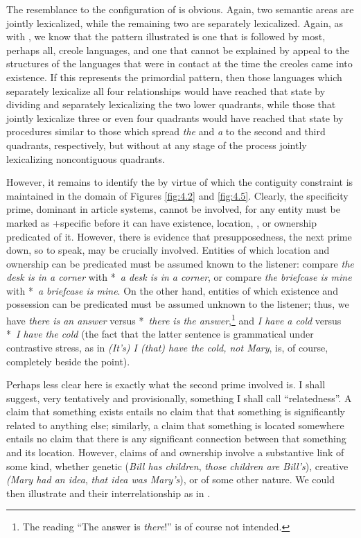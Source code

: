 The resemblance to the configuration of  is obvious. Again, two semantic areas are jointly lexicalized, while the remaining two are separately lexicalized. Again, as with , we know that the pattern illustrated is one that is followed by most, perhaps all, creole languages, and one that cannot be explained by appeal to the structures of the languages that were in contact at the time the creoles came into existence. If this represents the primordial pattern, then those languages which separately lexicalize all four relationships would have reached that state by dividing and separately lexicalizing the two lower quadrants, while those that jointly lexicalize three or even four quadrants would have reached that state by procedures similar to those which spread \textit{the} and \textit{a} to the second and third quadrants, respectively, but without at any stage of the process jointly lexicalizing noncontiguous quadrants.

However, it remains to identify the  by virtue of which the contiguity constraint is maintained in the domain of Figures \ref{fig:4.2} and \ref{fig:4.5}. Clearly, the specificity prime, dominant in article systems, cannot be involved, for any entity must be marked as +specific before it can have existence, location, , or ownership pre\-dicated of it. However, there is evidence that presupposedness, the next prime down, so to speak, may be crucially involved. Entities of which location and ownership can be predicated must be assumed known to the listener: compare \textit{the desk is in a corner} with *~\textit{a desk is in a corner}, or compare \textit{the briefcase is mine} with *~\textit{a briefcase is mine}. On the other hand, entities of which existence and possession can be predicated must be assumed unknown to the listener; thus, we have \textit{there is an answer} versus *~\textit{there is the answer},\footnote{The reading ``The answer is \textit{there}!'' is of course not intended.} and \textit{I have a cold} versus *~\textit{I have the cold} (the fact that the latter sentence is grammatical under contrastive stress, as in \textit{(It's) I (that) have the cold, not Mary}, is, of course, completely beside the point). 

Perhaps less clear here is exactly what the second prime in\-volved is. I shall suggest, very tentatively and provisionally, something I shall call ``relatedness''.  A claim that something exists entails no claim that that something is significantly related to anything else; similarly, a claim that something is located somewhere entails no claim that there is any significant connection between that something and its location. However, claims of  and ownership involve a substantive link of some kind, whether genetic (\textit{Bill has children}, \textit{those children are Bill's}), creative \textit{(Mary had an idea}, \textit{that idea was Mary's}), or of some other nature. We could then illustrate  and their interrelationship as in . %

